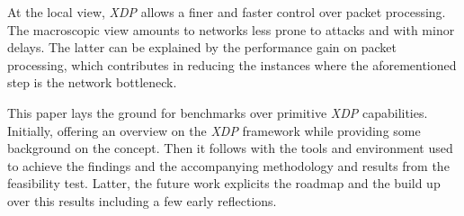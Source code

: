 At the local view, \textit{XDP} allows a finer and faster control over packet processing. 
The macroscopic view amounts to networks less prone to attacks and with minor delays.
The latter can be explained by the performance gain on packet processing, which contributes in reducing the instances where the aforementioned step is the network bottleneck.

This paper lays the ground for benchmarks over primitive \textit{XDP} capabilities.
Initially, offering an overview on the \textit{XDP} framework while providing some background on the concept.
Then it follows with the tools and environment used to achieve the findings and the accompanying methodology and results from the feasibility test.
Latter, the future work explicits the roadmap and the build up over this results including a few early reflections.

%
%

